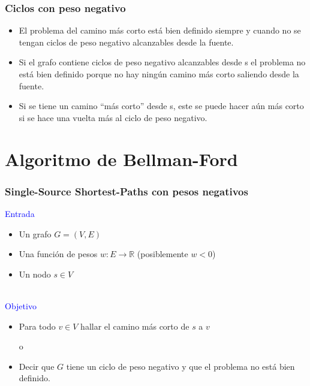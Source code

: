 \documentclass{beamer}
\begin{document}
	\begin{frame}
		\frametitle{Ciclos con peso negativo}
		\begin{itemize}
			\item El problema del camino más corto está bien definido siempre y cuando no se tengan ciclos de peso negativo alcanzables desde la fuente.
			\item Si el grafo contiene ciclos de peso negativo alcanzables desde s el problema no está bien definido porque no hay ningún camino más corto saliendo desde la fuente.
			\item Si se tiene un camino ``más corto'' desde s, este se puede hacer aún más corto si se hace una vuelta más al ciclo de peso negativo.
		\end{itemize}
	\end{frame}


\section{Algoritmo de Bellman-Ford}

	\begin{frame}
		\frametitle{Single-Source Shortest-Paths con pesos negativos}
		\textcolor{blue}{\large Entrada}\\
		\begin{itemize}
			\item Un grafo $G = (V, E)$
			\item Una función de pesos $w : E \rightarrow \mathbb{R}$ (posiblemente $w < 0$)
			\item Un nodo $s \in V$
		\end{itemize}
		\quad \\
		\textcolor{blue}{\large Objetivo}\\
		\begin{itemize}
			\item Para todo $v \in V$ hallar el camino más corto de $s$ a $v$ \\ 
				\begin{center} o \end{center}
			\item Decir que $G$ tiene un ciclo de peso negativo y que el problema no está bien definido.
		\end{itemize}
	\end{frame}
\end{document}
